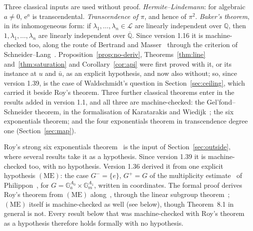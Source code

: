 \documentclass[11pt,a4paper]{article}
\theoremstyle{plain}
\theoremstyle{definition}
\newcommand{\e}{\mathrm{e}}
\newcommand{\Q}{\mathbb{Q}}
\newcommand{\Alg}{\overline{\mathbb{Q}}}
\newcommand{\Logs}{\mathcal{L}}
\begin{document}
Three classical inputs are used without proof. \emph{Hermite--Lindemann}: for algebraic
$a\neq0$, $\e^{a}$ is transcendental. \emph{Transcendence of $\pi$}, and hence of $\pi^{2}$.
\emph{Baker's theorem}, in its inhomogeneous form: if $\lambda_{1},\dots,\lambda_{n}\in\Logs$ are
linearly independent over $\Q$, then $1,\lambda_{1},\dots,\lambda_{n}$ are linearly independent over
$\Alg$. Since version 1.16 it is machine-checked too, along the route of Bertrand and
Masser~\cite{bertrand-masser} through the criterion of Schneider--Lang~\cite[Ch.~4]{waldschmidt-book}.
Proposition~\ref{prop:no-deriv}, Theorems~\ref{thm:line} and~\ref{thm:saturation} and
Corollary~\ref{cor:api} were first proved with it, or its instance at $u$ and $\bar u$, as an explicit
hypothesis, and now also without; so, since version 1.39, is the case of Waldschmidt's question in
Section~\ref{sec:ceiling}, which carried it beside Roy's theorem.
Three further classical theorems enter in the results added in version 1.1, and all three are
machine-checked: the Gel'fond--Schneider theorem, in the formalisation of Karatarakis and
Wiedijk~\cite{karatarakis-wiedijk}; the six exponentials theorem; and the four exponentials
theorem in transcendence degree one (Section~\ref{sec:map}).

Roy's strong six exponentials theorem~\cite{roy-1992} is the input of Section~\ref{sec:outside}, where several
results take it as a hypothesis. Since version 1.39 it is machine-checked too, with no hypothesis. Version
1.36 derived it from one explicit hypothesis $(\mathrm{ME})$: the case $G^{-}=\{e\}$, $G^{+}=G$ of the multiplicity estimate~\cite[Theorem~8.1]{waldschmidt-book}
of Philippon~\cite{philippon-1986}, for $G=\mathbb{G}_{a}^{A_{0}}\times\mathbb{G}_{m}^{A_{1}}$, written in coordinates.
The formal proof derives Roy's theorem from $(\mathrm{ME})$ along~\cite[\S\S11.6--11.7]{waldschmidt-book}, through
the linear subgroup theorem~\cite[Theorem~11.21]{waldschmidt-book}; $(\mathrm{ME})$ itself is machine-checked as well (see below),
though Theorem~8.1 in general is not. Every result below that was machine-checked with Roy's theorem as a
hypothesis therefore holds formally with no hypothesis.
\end{document}
